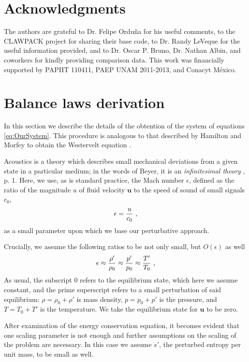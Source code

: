 \section{Acknowledgments}
\label{sec:acknowledges}

The authors are grateful to Dr. Felipe Ordu\~{n}a for his useful comments, 
to the CLAWPACK \citep{clawpack} project for sharing their base code, 
to Dr. Randy LeVeque for the useful information provided, 
and to Dr. Oscar P. Bruno, Dr. Nathan Albin, and coworkers for kindly providing comparison data.
This work was financially supported by PAPIIT 110411, PAEP UNAM 2011-2013, and Conacyt M\'{e}xico.

\appendix

\section{Balance laws derivation}
\label{sec:appendix}

In this section we describe the details of the obtention of the system of equations \eqref{eq:OurSystem}.
This procedure is analogous to that described by Hamilton and Morfey to obtain the Westervelt equation \citep{hamilton1998model}.

Acoustics is a theory which describes small mechanical deviations from a given state in a particular medium;
in the words of Beyer, it is an {\em infinitesimal theory} \citep{beyer}, p. 1.
Here, we use, as is standard practice, the Mach number $\epsilon$, defined as the ratio of the magnitude $u$ of fluid velocity $\mathbf{u}$ to the speed of sound of small signals $c_0$, 
\begin{align*}
  \epsilon = \frac{u}{c_0}
  \ \text{,}
\end{align*} 
as a small parameter upon which we base our perturbative approach.

Crucially, we assume the following ratios to be not only small, but $O(\epsilon)$ as well
\begin{align*}
  \epsilon 
  \approx \frac{\rho'}{\rho_0}
  \approx \frac{p'}{p_0}
  \approx \frac{T'}{T_0}
  \ \text{,}
\end{align*}
As usual, the subscript $0$ refers to the equilibrium state, which here we assume constant, and the prime superscript refers to a small perturbation of said equilibrium: $\rho= \rho_0 + \rho'$ is mass density, $p = p_0 + p'$ is the pressure, and $T = T_0 + T'$ is the temperature. We take the equilibrium state for $\mathbf{u}$ to be zero.

After examination of the energy conservation equation, it becomes evident that one scaling parameter is not enough and further assumptions on the scaling of the problem are necessary.
In this case we assume $s'$, the perturbed entropy per unit mass, to be small as well.

